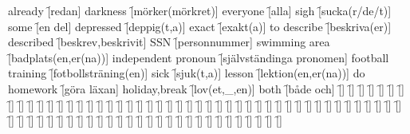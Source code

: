 \begin{questions}
\begin{multicols}{2}
        \question already \f[redan]
        \question darkness \f[mörker(mörkret)]
        \question everyone \f[alla]
        \question sigh \f[sucka(r/de/t)]
        \question some \f[en del]
        \question depressed \f[deppig(t,a)]
        \question exact \f[exakt(a)]
        \question to describe \f[beskriva(er)]
        \question described \f[beskrev,beskrivit]
        \question SSN \f[personnummer]
        \question swimming area \f[badplats(en,er(na))]
        \question independent pronoun \f[självständinga pronomen]
        \question football training \f[fotbollsträning(en)]
        \question sick \f[sjuk(t,a)]
        \question lesson \f[lektion(en,er(na))]
        \question do homework \f[göra läxan]
        \question holiday,break \f[lov(et,\_,en)]
        \question both \f[både och]
        \question  \f[]
        \question  \f[]
        \question  \f[]
        \question  \f[]
        \question  \f[]
        \question  \f[]
        \question  \f[]
        \question  \f[]
        \question  \f[]
        \question  \f[]
        \question  \f[]
        \question  \f[]
        \question  \f[]
        \question  \f[]
        \question  \f[]
        \question  \f[]
        \question  \f[]
        \question  \f[]
        \question  \f[]
        \question  \f[]
        \question  \f[]
        \question  \f[]
        \question  \f[]
        \question  \f[]
        \question  \f[]
        \question  \f[]
        \question  \f[]
        \question  \f[]
        \question  \f[]
        \question  \f[]
        \question  \f[]
        \question  \f[]
        \question  \f[]
        \question  \f[]
        \question  \f[]
        \question  \f[]
        \question  \f[]
        \question  \f[]
        \question  \f[]
        \question  \f[]
        \question  \f[]
        \question  \f[]
        \question  \f[]
        \question  \f[]
        \question  \f[]
        \question  \f[]
        \question  \f[]
        \question  \f[]
        \question  \f[]
        \question  \f[]
        \question  \f[]
        \question  \f[]
        \question  \f[]
        \question  \f[]
        \question  \f[]
        \question  \f[]
        \question  \f[]
        \question  \f[]
        \question  \f[]
        \question  \f[]
        \question  \f[]
        \question  \f[]
        \question  \f[]
        \question  \f[]
        \question  \f[]
        \question  \f[]
        \question  \f[]
        \question  \f[]
        \question  \f[]
        \question  \f[]
        \question  \f[]
        \question  \f[]
        \question  \f[]
        \question  \f[]
        \question  \f[]

\end{multicols}
\end{questions}
